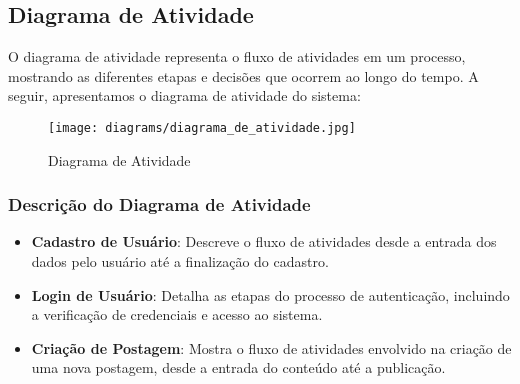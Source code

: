 \documentclass[../main.tex]{subfiles}
\begin{document}
\subsection{Diagrama de Atividade}
O diagrama de atividade representa o fluxo de atividades em um processo, mostrando as diferentes etapas e decisões que ocorrem ao longo do tempo. A seguir, apresentamos o diagrama de atividade do sistema:

\vspace{3cm}
\begin{figure}[htbp]
    \centering
    \texttt{[image: diagrams/diagrama\_de\_atividade.jpg]}
    \caption{Diagrama de Atividade}
    \label{fig:diagrama-de-atividade}
\end{figure}
\newpage
\subsubsection{Descrição do Diagrama de Atividade}
\begin{itemize}
    \item \textbf{Cadastro de Usuário}: Descreve o fluxo de atividades desde a entrada dos dados pelo usuário até a finalização do cadastro.
    \item \textbf{Login de Usuário}: Detalha as etapas do processo de autenticação, incluindo a verificação de credenciais e acesso ao sistema.
    \item \textbf{Criação de Postagem}: Mostra o fluxo de atividades envolvido na criação de uma nova postagem, desde a entrada do conteúdo até a publicação.
\end{itemize}
\end{document}
